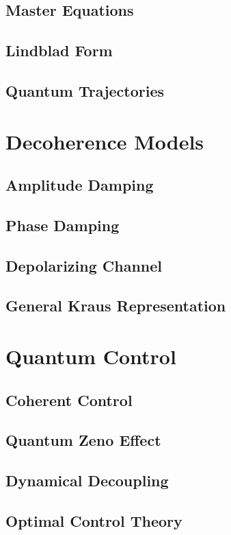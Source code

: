 \documentclass[12pt,a4paper]{book}
\begin{document}
\subsection{Master Equations}
\subsection{Lindblad Form}
\subsection{Quantum Trajectories}

\section{Decoherence Models}
\subsection{Amplitude Damping}
\subsection{Phase Damping}
\subsection{Depolarizing Channel}
\subsection{General Kraus Representation}

\section{Quantum Control}
\subsection{Coherent Control}
\subsection{Quantum Zeno Effect}
\subsection{Dynamical Decoupling}
\subsection{Optimal Control Theory}
\end{document}
